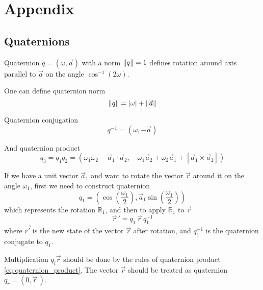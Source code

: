 \section{Appendix}
\subsection{Quaternions}

Quaternion $q = (\omega, \vec{a})$ with a norm $\left\lVert q\right\rVert = 1$ defines rotation around axis parallel to $\vec{a}$ on the angle $\cos^{-1}(2 \omega)$. 

One can define quaternion norm
\begin{equation}
\left\lVert q\right\rVert = |\omega| + \left\lVert\vec{a}\right\rVert
\end{equation}

Quaternion conjugation
\begin{equation}
q^{-1} = (\omega, -\vec{a})
\end{equation}

And quaternion product
\begin{equation}
\label{eq:quaternion_product}
q_3 = q_1 q_2 = \left(\omega_1 \omega_2 - \vec{a}_1 \cdot \vec{a}_2, \quad \omega_1 \vec{a}_2 + \omega_2 \vec{a}_1 + [\vec{a}_1 \times \vec{a}_2] \right)
\end{equation}

If we have a unit vector $\vec{a}_1$ and want to rotate the vector $\vec{r}$  around it on the angle $\omega_1$, first we need to construct quaternion
\begin{equation}
q_1 = \left(
		\cos\left(\frac{\omega_1}{2}\right),
		\vec{a}_1 \sin\left(\frac{\omega_1}{2}\right)
	\right)
\end{equation}
which represents the rotation $\mathbb{R}_1$, and then to apply $\mathbb{R}_1$ to $\vec{r}$
\begin{equation}
\label{eq:quaternion_rotation}
	\vec{r}\,' = q_1\, \vec{r}\, q_1^{-1}
\end{equation}
where $\vec{r'}$ is the new state of the vector $\vec{r}$ after rotation, and $q_1^{-1}$ is the quaternion conjugate to $q_1$.

Multiplication $q_i \vec{r}$ should be done by the rules of quaternion product \eqref{eq:quaternion_product}. The vector $\vec{r}$ should be treated as quaternion $q_r = (0, \vec{r}\,)$.

